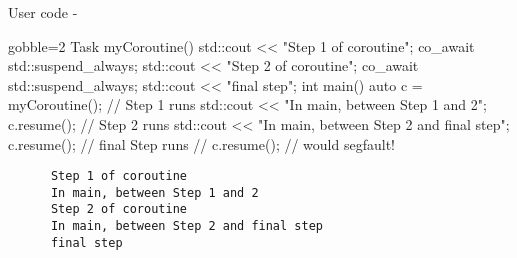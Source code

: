 \begin{frame}[fragile]
  \scriptsize
  \begin{block}{User code - }
    \begin{cppcode*}{gobble=2}
      Task myCoroutine() {
        std::cout << "Step 1 of coroutine\n";
        co_await std::suspend_always{};
        std::cout << "Step 2 of coroutine\n";
        co_await std::suspend_always{};
        std::cout << "final step\n";
      }
      int main() {
        auto c = myCoroutine(); // Step 1 runs
        std::cout << "In main, between Step 1 and 2\n";
        c.resume();             // Step 2 runs
        std::cout << "In main, between Step 2 and final step\n";
        c.resume();             // final Step runs
        // c.resume(); // would segfault!
      }
    \end{cppcode*}
  \end{block}
  \begin{block}{}
    \begin{verbatim}
      Step 1 of coroutine
      In main, between Step 1 and 2
      Step 2 of coroutine
      In main, between Step 2 and final step
      final step
    \end{verbatim}
  \end{block}
\end{frame}

